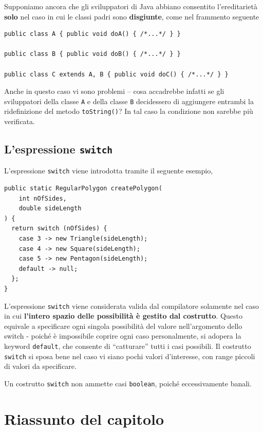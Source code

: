 \documentclass[\fontsizeclass,twocolumn]{\classname}
\theoremstyle{definition}
\theoremstyle{definition}
\begin{document}
Supponiamo ancora che gli sviluppatori di Java abbiano consentito l'ereditarietà \textbf{solo} nel caso in cui le classi padri sono \textbf{disgiunte}, come nel frammento seguente

\begin{lstlisting}
public class A { public void doA() { /*...*/ } }

public class B { public void doB() { /*...*/ } }

public class C extends A, B { public void doC() { /*...*/ } }
\end{lstlisting}

Anche in questo caso vi sono problemi \--- cosa accadrebbe infatti se gli
sviluppatori della classe \texttt{A} e della classe \texttt{B} decidessero di
aggiungere entrambi la ridefinizione del metodo \texttt{toString()}? In tal
caso la condizione non sarebbe più verificata.

\subsection{L'espressione \texttt{switch}}

L'espressione \texttt{switch} viene introdotta tramite il seguente esempio,

\begin{lstlisting}
public static RegularPolygon createPolygon(
    int nOfSides,
    double sideLength
) {
  return switch (nOfSides) {
    case 3 -> new Triangle(sideLength);
    case 4 -> new Square(sideLength);
    case 5 -> new Pentagon(sideLength);
    default -> null;
  };
}
\end{lstlisting}

L'espressione \texttt{switch} viene considerata valida dal compilatore
solamente nel caso in cui \textbf{l'intero spazio delle possibilità è gestito dal
costrutto}. Questo equivale a specificare ogni singola possibilità del valore
nell'argomento dello switch \-- poiché è impossibile coprire ogni caso
personalmente, si adopera la keyword \texttt{default}, che consente di
``catturare'' tutti i casi possibili. 
Il costrutto \texttt{switch} si sposa bene nel caso vi siano pochi valori
d'interesse, con range piccoli di valori da specificare.

Un costrutto \texttt{switch} non ammette casi \texttt{boolean}, poiché
eccessivamente banali.

\section{Riassunto del capitolo}
\end{document}
